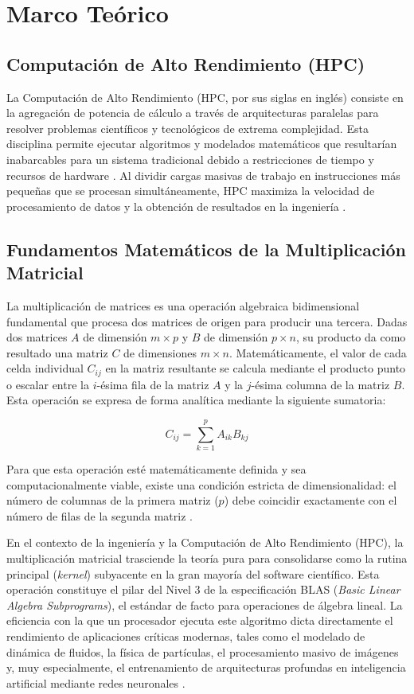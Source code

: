 \section{Marco Teórico}

\subsection{Computación de Alto Rendimiento (HPC)}
La Computación de Alto Rendimiento (HPC, por sus siglas en inglés) consiste en la agregación de potencia de cálculo a través de arquitecturas paralelas para resolver problemas científicos y tecnológicos de extrema complejidad. Esta disciplina permite ejecutar algoritmos y modelados matemáticos que resultarían inabarcables para un sistema tradicional debido a restricciones de tiempo y recursos de hardware \parencite{Hager2010HPC}. Al dividir cargas masivas de trabajo en instrucciones más pequeñas que se procesan simultáneamente, HPC maximiza la velocidad de procesamiento de datos y la obtención de resultados en la ingeniería \parencite{Patterson2017Computer}.

\subsection{Fundamentos Matemáticos de la Multiplicación Matricial}
La multiplicación de matrices es una operación algebraica bidimensional fundamental que procesa dos matrices de origen para producir una tercera. Dadas dos matrices \(A\) de dimensión \(m \times p\) y \(B\) de dimensión \(p \times n\), su producto da como resultado una matriz \(C\) de dimensiones \(m \times n\). Matemáticamente, el valor de cada celda individual \(C_{ij}\) en la matriz resultante se calcula mediante el producto punto o escalar entre la \(i\)-ésima fila de la matriz \(A\) y la \(j\)-ésima columna de la matriz \(B\). Esta operación se expresa de forma analítica mediante la siguiente sumatoria:

\[ C_{ij} = \sum_{k=1}^{p} A_{ik} B_{kj} \]

Para que esta operación esté matemáticamente definida y sea computacionalmente viable, existe una condición estricta de dimensionalidad: el número de columnas de la primera matriz (\(p\)) debe coincidir exactamente con el número de filas de la segunda matriz \parencite{Strang2016Linear}. 

En el contexto de la ingeniería y la Computación de Alto Rendimiento (HPC), la multiplicación matricial trasciende la teoría pura para consolidarse como la rutina principal (\textit{kernel}) subyacente en la gran mayoría del software científico. Esta operación constituye el pilar del Nivel 3 de la especificación BLAS (\textit{Basic Linear Algebra Subprograms}), el estándar de facto para operaciones de álgebra lineal. La eficiencia con la que un procesador ejecuta este algoritmo dicta directamente el rendimiento de aplicaciones críticas modernas, tales como el modelado de dinámica de fluidos, la física de partículas, el procesamiento masivo de imágenes y, muy especialmente, el entrenamiento de arquitecturas profundas en inteligencia artificial mediante redes neuronales \parencite{Dongarra1990BLAS}.


